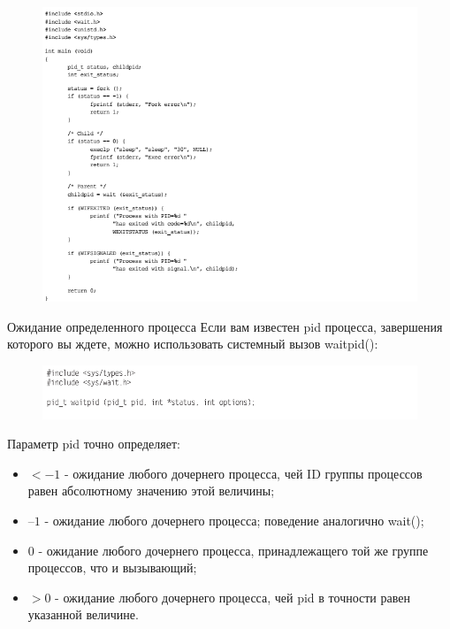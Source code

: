\documentclass{beamer}
\begin{document}
\begin{frame}
\begin{figure}[h]
\centering
\includegraphics[scale=0.6]{images/lec07-pic14.png}
\end{figure}
\end{frame}

\begin{frame}{Ожидание определенного процесса}
Если вам известен pid процесса, завершения которого вы ждете, можно использовать системный вызов waitpid():
\begin{figure}[h]
\centering
\includegraphics[scale=0.5]{images/lec07-pic15.png}
\end{figure}
Параметр pid точно определяет:
\begin{itemize}
\item $< -1$ - ожидание любого дочернего процесса, чей ID группы процессов равен
абсолютному значению этой величины;
\item $–1$ - ожидание любого дочернего процесса; поведение аналогично wait();
\item $0$ - ожидание любого дочернего процесса, принадлежащего той же группе процессов, что и вызывающий;
\item $> 0$ - ожидание любого дочернего процесса, чей pid в точности равен указанной
величине.
\end{itemize}
\end{frame}
\end{document}
